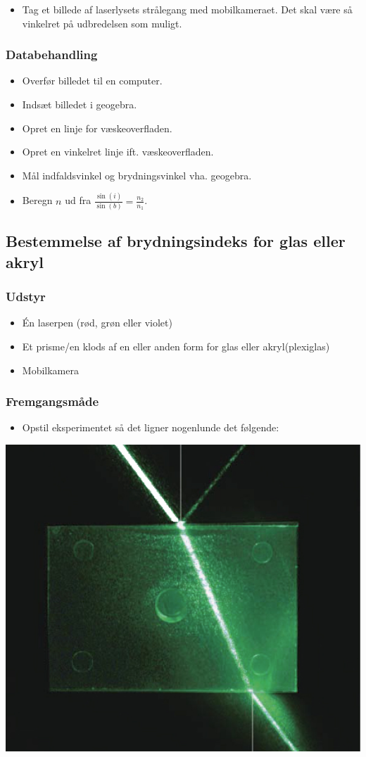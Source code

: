 \documentclass[a4paper, 12pt]{article}
\begin{document}
\begin{itemize}
\item Tag et billede af laserlysets strålegang med mobilkameraet. Det skal være så vinkelret på udbredelsen som muligt.
\end{itemize}

\subsubsection*{Databehandling}
\label{sec:orgd596a28}
\begin{itemize}
\item Overfør billedet til en computer.
\item Indsæt billedet i geogebra.
\item Opret en linje for væskeoverfladen.
\item Opret en vinkelret linje ift. væskeoverfladen.
\item Mål indfaldsvinkel og brydningsvinkel vha. geogebra.
\item Beregn \(n\) ud fra \(\frac{\sin(i)}{\sin(b)}=\frac{n_2}{n_1}\).
\end{itemize}

\newpage
\subsection*{Bestemmelse af brydningsindeks for glas eller akryl}
\label{sec:orgb0c7d45}

\subsubsection*{Udstyr}
\label{sec:orgd520018}
\begin{itemize}
\item Én laserpen (rød, grøn eller violet)
\item Et prisme/en klods af en eller anden form for glas eller akryl(plexiglas)
\item Mobilkamera
\end{itemize}
\subsubsection*{Fremgangsmåde}
\label{sec:org7c43fa2}
\begin{itemize}
\item Opstil eksperimentet så det ligner nogenlunde det følgende:
\end{itemize}

\begin{center}
\includegraphics[width=0.5\linewidth]{./img/brydningsindeks_glas_akryl.png}
\end{center}
\end{document}
